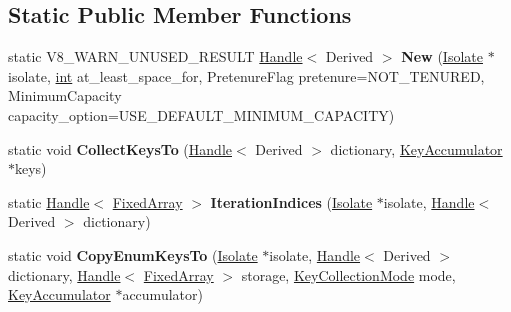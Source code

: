 \subsection*{Static Public Member Functions}
\begin{DoxyCompactItemize}
\item 
\mbox{\label{classv8_1_1internal_1_1BaseNameDictionary_a4432388f18ed57676aca34fb184cf297}} 
static V8\+\_\+\+W\+A\+R\+N\+\_\+\+U\+N\+U\+S\+E\+D\+\_\+\+R\+E\+S\+U\+LT \mbox{\hyperlink{classv8_1_1internal_1_1Handle}{Handle}}$<$ Derived $>$ {\bfseries New} (\mbox{\hyperlink{classv8_1_1internal_1_1Isolate}{Isolate}} $\ast$isolate, \mbox{\hyperlink{classint}{int}} at\+\_\+least\+\_\+space\+\_\+for, Pretenure\+Flag pretenure=N\+O\+T\+\_\+\+T\+E\+N\+U\+R\+ED, Minimum\+Capacity capacity\+\_\+option=U\+S\+E\+\_\+\+D\+E\+F\+A\+U\+L\+T\+\_\+\+M\+I\+N\+I\+M\+U\+M\+\_\+\+C\+A\+P\+A\+C\+I\+TY)
\item 
\mbox{\label{classv8_1_1internal_1_1BaseNameDictionary_ac8eaa90fbc30d10894c0578ee2fce1f8}} 
static void {\bfseries Collect\+Keys\+To} (\mbox{\hyperlink{classv8_1_1internal_1_1Handle}{Handle}}$<$ Derived $>$ dictionary, \mbox{\hyperlink{classv8_1_1internal_1_1KeyAccumulator}{Key\+Accumulator}} $\ast$keys)
\item 
\mbox{\label{classv8_1_1internal_1_1BaseNameDictionary_a2d61a07222d846a1f018f37323b8b62a}} 
static \mbox{\hyperlink{classv8_1_1internal_1_1Handle}{Handle}}$<$ \mbox{\hyperlink{classv8_1_1internal_1_1FixedArray}{Fixed\+Array}} $>$ {\bfseries Iteration\+Indices} (\mbox{\hyperlink{classv8_1_1internal_1_1Isolate}{Isolate}} $\ast$isolate, \mbox{\hyperlink{classv8_1_1internal_1_1Handle}{Handle}}$<$ Derived $>$ dictionary)
\item 
\mbox{\label{classv8_1_1internal_1_1BaseNameDictionary_a222462aca67da651735c4e5675d39704}} 
static void {\bfseries Copy\+Enum\+Keys\+To} (\mbox{\hyperlink{classv8_1_1internal_1_1Isolate}{Isolate}} $\ast$isolate, \mbox{\hyperlink{classv8_1_1internal_1_1Handle}{Handle}}$<$ Derived $>$ dictionary, \mbox{\hyperlink{classv8_1_1internal_1_1Handle}{Handle}}$<$ \mbox{\hyperlink{classv8_1_1internal_1_1FixedArray}{Fixed\+Array}} $>$ storage, \mbox{\hyperlink{namespacev8_a0cee20f5c7f0d59d0835af8e537388dc}{Key\+Collection\+Mode}} mode, \mbox{\hyperlink{classv8_1_1internal_1_1KeyAccumulator}{Key\+Accumulator}} $\ast$accumulator)

\end{DoxyCompactItemize}
